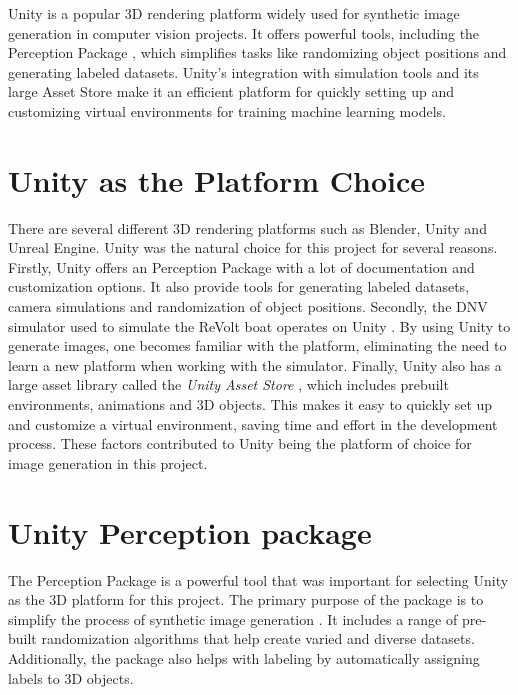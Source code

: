 Unity is a popular 3D rendering platform widely used for synthetic image generation in computer vision projects. It offers powerful tools, including the Perception Package \cite{unity-perception2022}, which simplifies tasks like randomizing object positions and generating labeled datasets. Unity's integration with simulation tools and its large Asset Store \cite{UnityAssetStore} make it an efficient platform for quickly setting up and customizing virtual environments for training machine learning models.

\section{Unity as the Platform Choice}
There are several different 3D rendering platforms such as Blender, Unity and Unreal Engine. Unity was the natural choice for this project for several reasons. Firstly, Unity offers an Perception Package \cite{unity-perception2022} with a lot of documentation and customization options. It also provide tools for generating labeled datasets, camera simulations and randomization of object positions. Secondly, the DNV simulator used to simulate the ReVolt boat operates on Unity \cite{dnv_wiki}. By using Unity to generate images, one becomes familiar with the platform, eliminating the need to learn a new platform when working with the simulator. Finally, Unity also has a large asset library called the \textit{Unity Asset Store} \cite{UnityAssetStore}, which includes prebuilt environments, animations and 3D objects. This makes it easy to quickly set up and customize a virtual environment, saving time and effort in the development process. These factors contributed to Unity being the platform of choice for image generation in this project.


\section{Unity Perception package}
The Perception Package is a powerful tool that was important for selecting Unity as the 3D platform for this project. The primary purpose of the package is to simplify the process of synthetic image generation \cite{borkman2021unityperceptiongeneratesynthetic}. It includes a range of pre-built randomization algorithms that help create varied and diverse datasets. Additionally, the package also helps with labeling by automatically assigning labels to 3D objects.

